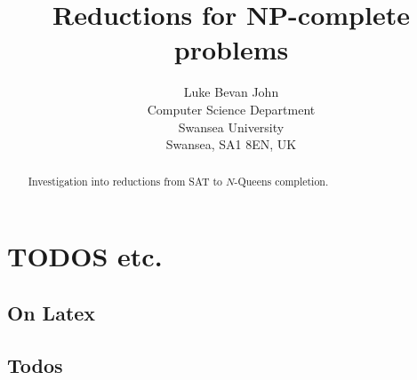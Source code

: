\documentclass[a4paper]{report}
\begin{document}
\title{Reductions for NP-complete problems}

\author{Luke Bevan John\\
  Computer Science Department\\
  Swansea University\\
  Swansea, SA1 8EN, UK
}
\date{}

\maketitle

\begin{abstract}
  Investigation into reductions from SAT to $N$-Queens completion.
\end{abstract}

\tableofcontents


\setcounter{chapter}{-1}

\chapter{TODOS etc.}
\label{cha:todos}

\section{On Latex}
\label{sec:todoslatex}

\cite{lamport94}


\section{Todos}
\label{sec:todostodos}
\end{document}
